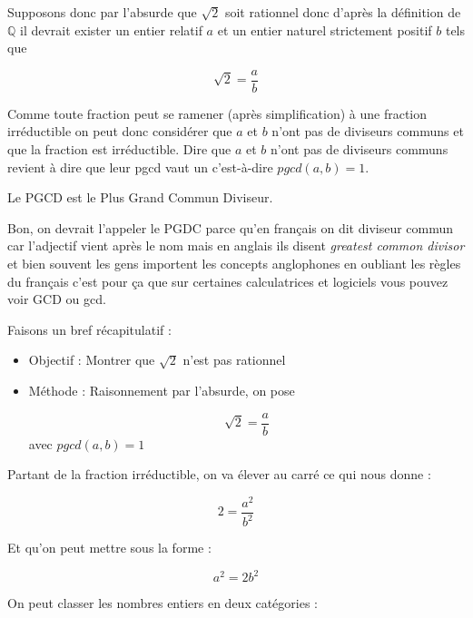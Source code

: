 \documentclass[a4paper,11pt]{book}
\begin{document}
Supposons donc par l'absurde que \(\sqrt{2}\) soit
rationnel donc d'après la définition de
\(\mathbb{Q}\) il devrait exister un entier
relatif \(a\) et un entier
naturel strictement positif \(b\) tels que

\[\sqrt{2} = \dfrac{a}{b}\]

Comme toute fraction peut se ramener (après simplification) à une
fraction irréductible on peut donc
considérer que \(a\) et \(b\) n'ont pas de diviseurs communs et que la
fraction est irréductible. Dire que \(a\) et \(b\) n'ont pas de
diviseurs communs revient à dire que leur pgcd vaut un
c'est-à-dire \(pgcd(a, b) = 1\).


Le PGCD est le Plus Grand Commun Diviseur.

Bon, on devrait l'appeler le PGDC parce qu'en français on dit diviseur
commun car l'adjectif vient après le nom mais en anglais ils disent
\emph{greatest common divisor} et bien souvent les gens importent les
concepts anglophones en oubliant les règles du français c'est pour
ça que sur certaines calculatrices et logiciels vous pouvez voir
GCD ou gcd.



Faisons un bref récapitulatif :


\begin{itemize}
\item Objectif : Montrer que \(\sqrt{2}\) n'est pas
rationnel
\item Méthode : Raisonnement par l'absurde, on
pose

\[\sqrt{2} = \dfrac{a}{b}\] avec \(pgcd(a, b) = 1\)
\end{itemize}



Partant de la fraction irréductible, on va élever au carré ce qui nous
donne :

\[2 = \dfrac{a^2}{b^2}\]

Et qu'on peut mettre sous la forme :

\[a^2 = 2b^2\]



On peut classer les nombres entiers en deux catégories :
\end{document}
